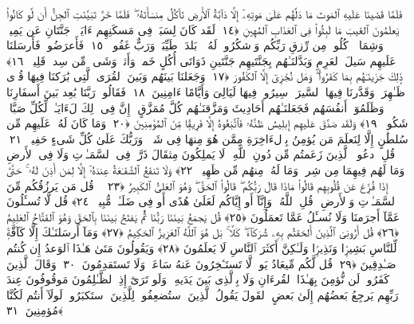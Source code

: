 فَلَمَّا قَضَينَا عَلَيهِ ٱلمَوتَ مَا دَلَّهُم عَلَىٰ مَوتِهِۦٓ إِلَّا دَآبَّةُ ٱلأَرضِ تَأكُلُ مِنسَأَتَهُۥ ۖ فَلَمَّا خَرَّ تَبَيَّنَتِ ٱلجِنُّ أَن لَّو كَانُوا۟ يَعلَمُونَ ٱلغَيبَ مَا لَبِثُوا۟ فِى ٱلعَذَابِ ٱلمُهِينِ ﴿١٤﴾
 لَقَد كَانَ لِسَبَإٍۢ فِى مَسكَنِهِم ءَايَةٌۭ ۖ جَنَّتَانِ عَن يَمِينٍۢ وَشِمَالٍۢ ۖ كُلُوا۟ مِن رِّزقِ رَبِّكُم وَٱشكُرُوا۟ لَهُۥ ۚ بَلدَةٌۭ طَيِّبَةٌۭ وَرَبٌّ غَفُورٌۭ ﴿١٥﴾
 فَأَعرَضُوا۟ فَأَرسَلنَا عَلَيهِم سَيلَ ٱلعَرِمِ وَبَدَّلنَـٰهُم بِجَنَّتَيهِم جَنَّتَينِ ذَوَاتَى أُكُلٍ خَمطٍۢ وَأَثلٍۢ وَشَىءٍۢ مِّن سِدرٍۢ قَلِيلٍۢ ﴿١٦﴾
 ذَٟلِكَ جَزَينَـٰهُم بِمَا كَفَرُوا۟ ۖ وَهَل نُجَٰزِىٓ إِلَّا ٱلكَفُورَ ﴿١٧﴾
 وَجَعَلنَا بَينَهُم وَبَينَ ٱلقُرَى ٱلَّتِى بَٰرَكنَا فِيهَا قُرًۭى ظَـٰهِرَةًۭ وَقَدَّرنَا فِيهَا ٱلسَّيرَ ۖ سِيرُوا۟ فِيهَا لَيَالِىَ وَأَيَّامًا ءَامِنِينَ ﴿١٨﴾
 فَقَالُوا۟ رَبَّنَا بَٰعِد بَينَ أَسفَارِنَا وَظَلَمُوٓا۟ أَنفُسَهُم فَجَعَلنَـٰهُم أَحَادِيثَ وَمَزَّقنَـٰهُم كُلَّ مُمَزَّقٍ ۚ إِنَّ فِى ذَٟلِكَ لَءَايَـٰتٍۢ لِّكُلِّ صَبَّارٍۢ شَكُورٍۢ ﴿١٩﴾
 وَلَقَد صَدَّقَ عَلَيهِم إِبلِيسُ ظَنَّهُۥ فَٱتَّبَعُوهُ إِلَّا فَرِيقًۭا مِّنَ ٱلمُؤمِنِينَ ﴿٢٠﴾
 وَمَا كَانَ لَهُۥ عَلَيهِم مِّن سُلطَٰنٍ إِلَّا لِنَعلَمَ مَن يُؤمِنُ بِٱلءَاخِرَةِ مِمَّن هُوَ مِنهَا فِى شَكٍّۢ ۗ وَرَبُّكَ عَلَىٰ كُلِّ شَىءٍ حَفِيظٌۭ ﴿٢١﴾
 قُلِ ٱدعُوا۟ ٱلَّذِينَ زَعَمتُم مِّن دُونِ ٱللَّهِ ۖ لَا يَملِكُونَ مِثقَالَ ذَرَّةٍۢ فِى ٱلسَّمَـٰوَٟتِ وَلَا فِى ٱلأَرضِ وَمَا لَهُم فِيهِمَا مِن شِركٍۢ وَمَا لَهُۥ مِنهُم مِّن ظَهِيرٍۢ ﴿٢٢﴾
 وَلَا تَنفَعُ ٱلشَّفَـٰعَةُ عِندَهُۥٓ إِلَّا لِمَن أَذِنَ لَهُۥ ۚ حَتَّىٰٓ إِذَا فُزِّعَ عَن قُلُوبِهِم قَالُوا۟ مَاذَا قَالَ رَبُّكُم ۖ قَالُوا۟ ٱلحَقَّ ۖ وَهُوَ ٱلعَلِىُّ ٱلكَبِيرُ ﴿٢٣﴾
 ۞ قُل مَن يَرزُقُكُم مِّنَ ٱلسَّمَـٰوَٟتِ وَٱلأَرضِ ۖ قُلِ ٱللَّهُ ۖ وَإِنَّآ أَو إِيَّاكُم لَعَلَىٰ هُدًى أَو فِى ضَلَـٰلٍۢ مُّبِينٍۢ ﴿٢٤﴾
 قُل لَّا تُسـَٔلُونَ عَمَّآ أَجرَمنَا وَلَا نُسـَٔلُ عَمَّا تَعمَلُونَ ﴿٢٥﴾
 قُل يَجمَعُ بَينَنَا رَبُّنَا ثُمَّ يَفتَحُ بَينَنَا بِٱلحَقِّ وَهُوَ ٱلفَتَّاحُ ٱلعَلِيمُ ﴿٢٦﴾
 قُل أَرُونِىَ ٱلَّذِينَ أَلحَقتُم بِهِۦ شُرَكَآءَ ۖ كَلَّا ۚ بَل هُوَ ٱللَّهُ ٱلعَزِيزُ ٱلحَكِيمُ ﴿٢٧﴾
 وَمَآ أَرسَلنَـٰكَ إِلَّا كَآفَّةًۭ لِّلنَّاسِ بَشِيرًۭا وَنَذِيرًۭا وَلَـٰكِنَّ أَكثَرَ ٱلنَّاسِ لَا يَعلَمُونَ ﴿٢٨﴾
 وَيَقُولُونَ مَتَىٰ هَـٰذَا ٱلوَعدُ إِن كُنتُم صَـٰدِقِينَ ﴿٢٩﴾
 قُل لَّكُم مِّيعَادُ يَومٍۢ لَّا تَستَـٔخِرُونَ عَنهُ سَاعَةًۭ وَلَا تَستَقدِمُونَ ﴿٣٠﴾
 وَقَالَ ٱلَّذِينَ كَفَرُوا۟ لَن نُّؤمِنَ بِهَـٰذَا ٱلقُرءَانِ وَلَا بِٱلَّذِى بَينَ يَدَيهِ ۗ وَلَو تَرَىٰٓ إِذِ ٱلظَّـٰلِمُونَ مَوقُوفُونَ عِندَ رَبِّهِم يَرجِعُ بَعضُهُم إِلَىٰ بَعضٍ ٱلقَولَ يَقُولُ ٱلَّذِينَ ٱستُضعِفُوا۟ لِلَّذِينَ ٱستَكبَرُوا۟ لَولَآ أَنتُم لَكُنَّا مُؤمِنِينَ ﴿٣١﴾
